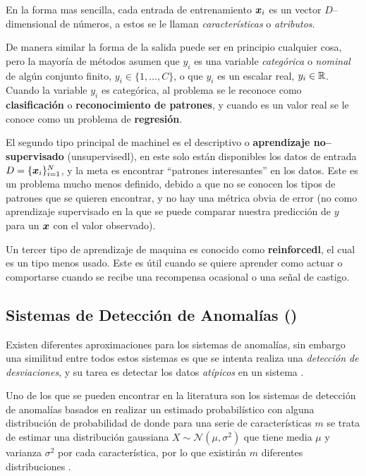 En la forma mas sencilla, cada entrada de entrenamiento ${\bm{x}}_i$ es un vector $D$--dimensional de números, a estos se le llaman \emph{características} o \emph{atributos}.

De manera similar la forma de la salida puede ser en principio cualquier cosa, pero la mayoría de métodos asumen que $y_i$ es una variable \emph{categórica} o \emph{nominal} de algún conjunto finito, $y_i \in \{1,\ldots,C\}$, o que $y_i$ es un escalar real, $y_i \in \mathbb{R}$. Cuando la variable $y_i$ es categórica, al problema se le reconoce como \textbf{clasificación} o \textbf{reconocimiento de patrones}, y cuando es un valor real se le conoce como un problema de \textbf{regresión}.

El segundo tipo principal de \gls{machinel} es el descriptivo o \textbf{aprendizaje no--supervisado} (\gls{unsupervisedl}), en este solo están disponibles los datos de entrada $D = \{{\bm{x}}_i\}_{i=1}^{N}$, y la meta es encontrar ``patrones interesantes'' en los datos. Este es un problema mucho menos definido, debido a que no se conocen los tipos de patrones que se quieren encontrar, y no hay una métrica obvia de error (no como aprendizaje supervisado en la que se puede comparar nuestra predicción de $y$ para un ${\bm{x}}$ con el valor observado).

Un tercer tipo de aprendizaje de maquina es conocido como \textbf{\gls{reinforcedl}}, el cual es un tipo menos usado. Este es útil cuando se quiere aprender como actuar o comportarse cuando se recibe una recompensa ocasional o una señal de castigo.

\subsection{Sistemas de Detección de Anomalías ()}
Existen diferentes aproximaciones para los sistemas de anomalías, sin embargo una similitud entre todos estos sistemas es que se intenta realiza una \emph{detección de desviaciones}, y su tarea es detectar los datos \emph{atípicos} en un sistema \cite{tan2005introduction}.

Uno de los que se pueden encontrar en la literatura son los sistemas de detección de anomalías basados en realizar un estimado probabilístico con alguna distribución de probabilidad de donde para una serie de características $m$ se trata de estimar una distribución gaussiana $X \sim \mathcal{N}(\mu, \sigma^2)$ que tiene media $\mu$ y varianza $\sigma^2$ por cada característica, por lo que existirán $m$ diferentes distribuciones .

